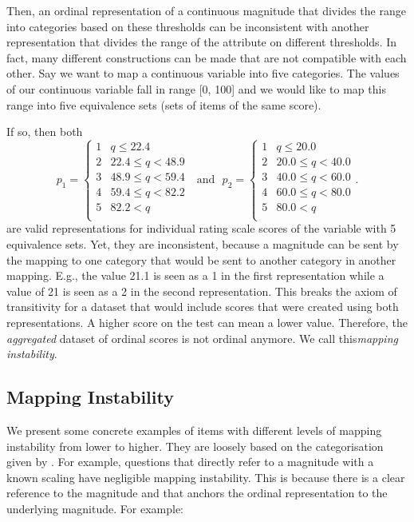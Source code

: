 \documentclass[titlepage, a4paper, 11pt]{article}
\begin{document}
Then, an ordinal representation of a continuous magnitude that divides the range into categories based on these thresholds can be inconsistent with another representation that divides the range of the attribute on different thresholds. In fact, many different constructions can be made that are not compatible with each other. Say we want to map a continuous variable into five categories. The values of our continuous variable fall in range [0, 100] and we would like to map this range into five equivalence sets (sets of items of the same score).

If so, then both
\[
p_{1} = 
\begin{cases} 
    1 & q \leq 22.4\\
    2 & 22.4 \leq q < 48.9\\
    3 & 48.9 \leq q < 59.4\\
    4 & 59.4 \leq q < 82.2\\    
    5 & 82.2 < q\\
\end{cases}
\ \ \ \text{and}\ \ \ 
p_{2} =
\begin{cases} 
    1 & q \leq 20.0\\
    2 & 20.0 \leq q < 40.0\\
    3 & 40.0 \leq q < 60.0\\
    4 & 60.0 \leq q < 80.0\\
    5 & 80.0 < q\\
\end{cases}.
\]
are valid representations for individual rating scale scores of the variable with 5 equivalence sets. Yet, they are inconsistent, because a magnitude can be sent by the mapping to one category that would be sent to another category in another mapping. E.g., the value 21.1 is seen as a 1 in the first representation while a value of 21 is seen as a 2 in the second representation. This breaks the axiom of transitivity for a dataset that would include scores that were created using both representations. A higher score on the test can mean a lower value. Therefore, the \textit{aggregated} dataset of ordinal scores is not ordinal anymore. We call this\textit{mapping instability}.

\subsection{Mapping Instability}
We present some concrete examples of items with different levels of mapping instability from lower to higher. They are loosely based on the categorisation given by \citet{kampen_ordinal_2000}. For example, questions that directly refer to a magnitude with a known scaling have negligible mapping instability. This is because there is a clear reference to the magnitude and that anchors the ordinal representation to the underlying magnitude. For example:
\end{document}
